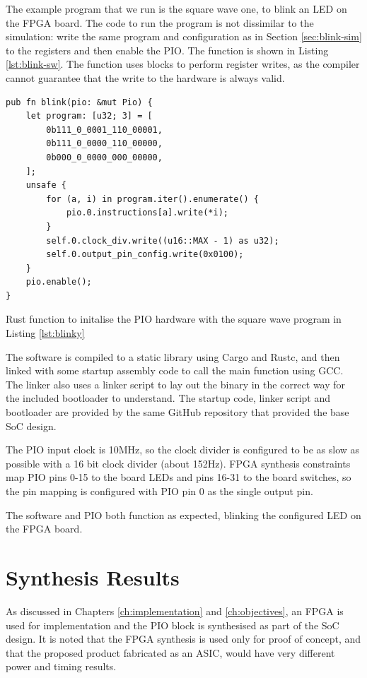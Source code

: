 The example program that we run is the square wave one, to blink an LED on the FPGA board. The code to run the program is not dissimilar to the simulation: write the same program and configuration as in Section \ref{sec:blink-sim} to the registers and then enable the PIO. The function is shown in Listing \ref{lst:blink-sw}. The function uses  blocks to perform register writes, as the compiler cannot guarantee that the write to the hardware is always valid.

\begin{listing}[h!]
    \begin{verbatim}
pub fn blink(pio: &mut Pio) {
    let program: [u32; 3] = [
        0b111_0_0001_110_00001,
        0b111_0_0000_110_00000,
        0b000_0_0000_000_00000,
    ];
    unsafe {
        for (a, i) in program.iter().enumerate() {
            pio.0.instructions[a].write(*i);
        }
        self.0.clock_div.write((u16::MAX - 1) as u32);
        self.0.output_pin_config.write(0x0100);
    }
    pio.enable();
}
    \end{verbatim}
    \caption{Rust function to initalise the PIO hardware with the square wave program in Listing \ref{lst:blinky}}
    \label{lst:blink-sw}
\end{listing}

The software is compiled to a static library using Cargo and Rustc, and then linked with some startup assembly code to call the main function using GCC. The linker also uses a linker script to lay out the binary in the correct way for the included bootloader to understand. The startup code, linker script and bootloader are provided by the same GitHub repository that provided the base SoC design.

The PIO input clock is 10MHz, so the clock divider is configured to be as slow as possible with a 16 bit clock divider (about 152Hz). FPGA synthesis constraints map PIO pins 0-15 to the board LEDs and pins 16-31 to the board switches, so the pin mapping is configured with PIO pin 0 as the single output pin.

The software and PIO both function as expected, blinking the configured LED on the FPGA board.

\section{Synthesis Results}
As discussed in Chapters \ref{ch:implementation} and \ref{ch:objectives}, an FPGA is used for implementation and the PIO block is synthesised as part of the SoC design. It is noted that the FPGA synthesis is used only for proof of concept, and that the proposed product fabricated as an ASIC, would have very different power and timing results.

